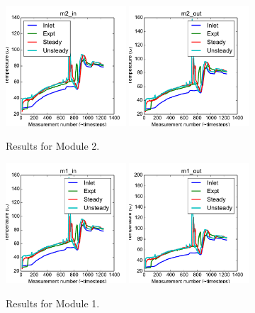 \documentclass{article}
\begin{document}
\clearpage
\begin{figure}[!ht]
\centering
\includegraphics[width=0.4\textwidth]{../../data/ICSolar/images/Jan31_m2_in_compare.pdf}\hspace{0.05\textwidth}
\includegraphics[width=0.4\textwidth]{../../data/ICSolar/images/Jan31_m2_out_compare.pdf}\hspace{0.05\textwidth}\\
\caption{Results for Module 2.}\end{figure}
\begin{figure}[!ht]
\centering
\includegraphics[width=0.4\textwidth]{../../data/ICSolar/images/Jan31_m1_in_compare.pdf}\hspace{0.05\textwidth}
\includegraphics[width=0.4\textwidth]{../../data/ICSolar/images/Jan31_m1_out_compare.pdf}\hspace{0.05\textwidth}\\
\caption{Results for Module 1.}\end{figure}
\end{document}
